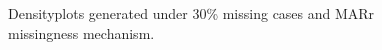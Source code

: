 \documentclass[12pt, fullpage, a4paper]{article}
\begin{document}
\begin{figure}
\begin{center}
{{			}
		}
	\end{center}
	\caption{Densityplots generated under 30\% missing cases and MARr missingness mechanism.}
	\label{fig6}
\end{figure}
\end{document}

